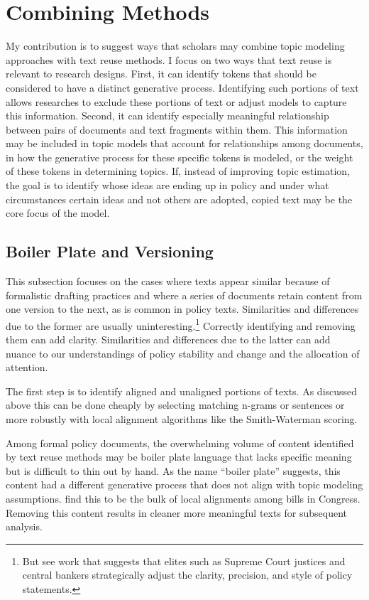 \documentclass{article}
\begin{document}
\section{Combining Methods}
My contribution is to suggest ways that scholars may combine topic modeling approaches with text reuse methods. I focus on two ways that text reuse is relevant to research designs. First, it can identify tokens that should be considered to have a distinct generative process. Identifying such portions of text allows researches to exclude these portions of text or adjust models to capture this information. Second, it can identify especially meaningful relationship between pairs of documents and text fragments within them. This information may be included in topic models that account for relationships among documents, in how the generative process for these specific tokens is modeled, or the weight of these tokens in determining topics. If, instead of improving topic estimation, the goal is to identify whose ideas are ending up in policy and under what circumstances certain ideas and not others are adopted, copied text may be the core focus of the model. 

\subsection{Boiler Plate and Versioning}

This subsection focuses on the cases where texts appear similar because of formalistic drafting practices and where a series of documents retain content from one version to the next, as is common in policy texts. Similarities and differences due to the former are usually uninteresting.\footnote{But see work that suggests that elites such as Supreme Court justices \citep{Owens2013} and central bankers \citep{Baerg2014} strategically adjust the clarity, precision, and style of policy statements.} Correctly identifying and removing them can add clarity. Similarities and differences due to the latter can add nuance to our understandings of policy stability and change and the allocation of attention. 

The first step is to identify aligned and unaligned portions of texts. As discussed above this can be done cheaply by selecting matching n-grams or sentences or more robustly with local alignment algorithms like the Smith-Waterman scoring.

Among formal policy documents, the overwhelming volume of content identified by text reuse methods may be boiler plate language that lacks specific meaning but is difficult to thin out by hand. As the name ``boiler plate'' suggests, this content had a different generative process that does not align with topic modeling assumptions. \citet{Wilkerson2015} find this to be the bulk of local alignments among bills in Congress. Removing this content results in cleaner more meaningful texts for subsequent analysis. 
\end{document}
